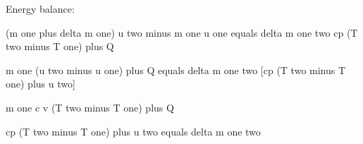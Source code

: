Energy balance:

(m one plus delta m one) u two minus m one u one equals delta m one two cp (T two minus T one) plus Q

m one (u two minus u one) plus Q equals delta m one two [cp (T two minus T one) plus u two]

m one c v (T two minus T one) plus Q

cp (T two minus T one) plus u two equals delta m one two